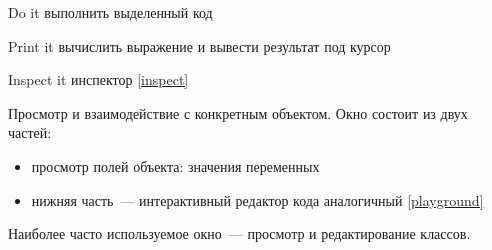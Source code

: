 
\begin{description}
    \item{Do it}  выполнить выделенный код
    \item{Print it}  вычислить выражение и вывести результат под курсор
    \item{Inspect it}  инспектор \ref{inspect}
\end{description}

\label{inspect}


Просмотр и взаимодействие с конкретным объектом. Окно состоит из двух частей:
\begin{itemize}
    \item просмотр полей объекта: значения переменных
    \item нижняя часть\ --- интерактивный редактор кода аналогичный \ref{playground}
\end{itemize}

\clearpage
{}

\clearpage

Наиболее часто используемое окно\ --- просмотр и редактирование классов.


\secup
